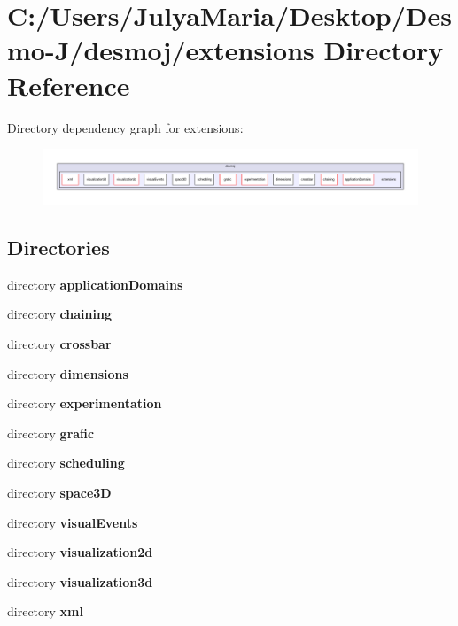 \section{C\-:/\-Users/\-Julya\-Maria/\-Desktop/\-Desmo-\/\-J/desmoj/extensions Directory Reference}
\label{dir_9a337ff3792e8fc84c07eb6f8690b97c}
Directory dependency graph for extensions\-:
\nopagebreak
\begin{figure}[H]
\begin{center}
\leavevmode
\includegraphics[width=350pt]{dir_9a337ff3792e8fc84c07eb6f8690b97c_dep}
\end{center}
\end{figure}
\subsection*{Directories}
\begin{DoxyCompactItemize}
\item 
directory {\bf application\-Domains}
\item 
directory {\bf chaining}
\item 
directory {\bf crossbar}
\item 
directory {\bf dimensions}
\item 
directory {\bf experimentation}
\item 
directory {\bf grafic}
\item 
directory {\bf scheduling}
\item 
directory {\bf space3\-D}
\item 
directory {\bf visual\-Events}
\item 
directory {\bf visualization2d}
\item 
directory {\bf visualization3d}
\item 
directory {\bf xml}
\end{DoxyCompactItemize}
